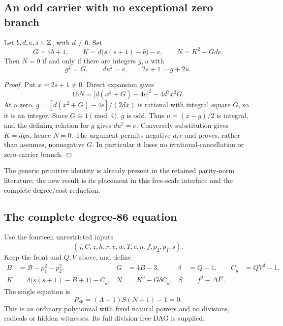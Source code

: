 \subsection{An odd carrier with no exceptional zero branch}
\begin{lemma}
Let $b,d,e,s\in\mathbb Z$, with $d\ne0$. Set
\[
 G=4b+1,\qquad K=d\bigl(s(s+1)-b\bigr)-e,
 \qquad N=K^2-Gde.
\]
Then $N=0$ if and only if there are integers $g,u$ with
\[
 g^2=G,\qquad du^2=e,\qquad 2s+1=g+2u.
\]
\end{lemma}
\begin{proof}
Put $x=2s+1\ne0$. Direct expansion gives
\[
 16N=\bigl[d(x^2+G)-4e\bigr]^2-4d^2x^2G.
\]
At a zero, $g=[d(x^2+G)-4e]/(2dx)$ is rational with integral square $G$,
so it is an integer. Since $G\equiv1\pmod4$, $g$ is odd. Thus
$u=(x-g)/2$ is integral, and the defining relation for $g$ gives $du^2=e$.
Conversely substitution gives $K=dgu$, hence $N=0$.
The argument permits negative $d,e$ and proves, rather than assumes,
nonnegative $G$. In particular it loses no irrational-cancellation or
zero-carrier branch.
\end{proof}
The generic primitive identity is already present in the retained parity-norm
literature; the new result is its placement in this free-scale interface and
the complete degree/cost reduction.

\subsection{The complete degree-86 equation}
Use the fourteen unrestricted inputs
\[
 (j,C,z,h,r,v,w,T,c,n,f,p_2,p_1,s).
\]
Keep the front and $Q,V$ above, and define
\begin{align*}
 B&=\mathcal B-p_1^2-p_2^2,&G&=4B-3,&\delta&=Q-1,&C_y&=QV^2-1,\\
 K&=\delta\bigl(s(s+1)-B+1\bigr)-C_y,&
 N&=K^2-G\delta C_y,&S&=f^2-\Delta I^2.
\end{align*}
The single equation is
\begin{equation}\label{eq:root86}
 \boxed{\;P_{86}=(A+1)S(N+1)-1=0.\;}
\end{equation}
This is an ordinary polynomial with fixed natural powers and no divisions,
radicals or hidden witnesses. Its full division-free DAG is supplied.

